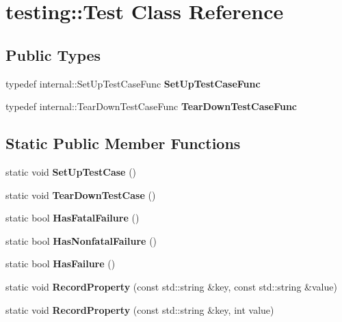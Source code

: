 \hypertarget{classtesting_1_1Test}{}\section{testing\+:\+:Test Class Reference}
\label{classtesting_1_1Test}
\subsection*{Public Types}
\begin{DoxyCompactItemize}
\item 
\mbox{\label{classtesting_1_1Test_a5f2a051d1d99c9b784c666c586186cf9}} 
typedef internal\+::\+Set\+Up\+Test\+Case\+Func {\bfseries Set\+Up\+Test\+Case\+Func}
\item 
\mbox{\label{classtesting_1_1Test_aa0f532e93b9f3500144c53f31466976c}} 
typedef internal\+::\+Tear\+Down\+Test\+Case\+Func {\bfseries Tear\+Down\+Test\+Case\+Func}
\end{DoxyCompactItemize}
\subsection*{Static Public Member Functions}
\begin{DoxyCompactItemize}
\item 
\mbox{\label{classtesting_1_1Test_a5ccbac42fee8c5b00b0bfe89b6c49d79}} 
static void {\bfseries Set\+Up\+Test\+Case} ()
\item 
\mbox{\label{classtesting_1_1Test_af374706cbaf0ffc460f4fd04e7c150f1}} 
static void {\bfseries Tear\+Down\+Test\+Case} ()
\item 
\mbox{\label{classtesting_1_1Test_a0a89846458f0e8ed1c9457c957e8182a}} 
static bool {\bfseries Has\+Fatal\+Failure} ()
\item 
\mbox{\label{classtesting_1_1Test_a07e896f1b1836f8ac075c26d7b7c9fb8}} 
static bool {\bfseries Has\+Nonfatal\+Failure} ()
\item 
\mbox{\label{classtesting_1_1Test_a7a00be7dd0a6bfdc8d47a1b784623613}} 
static bool {\bfseries Has\+Failure} ()
\item 
\mbox{\label{classtesting_1_1Test_ae0448aec9e389fab70f6a75a59ff6aa2}} 
static void {\bfseries Record\+Property} (const std\+::string \&key, const std\+::string \&value)
\item 
\mbox{\label{classtesting_1_1Test_af602903efb17730b977304fc56500881}} 
static void {\bfseries Record\+Property} (const std\+::string \&key, int value)
\end{DoxyCompactItemize}
